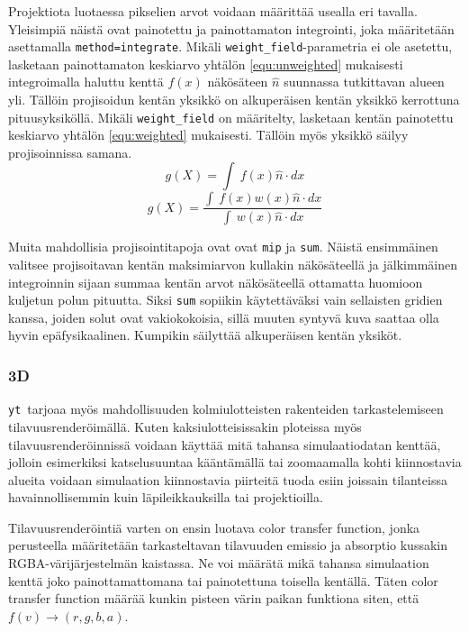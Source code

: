 \documentclass[12pt,a4paper]{article}
\newcommand{\yt}{\texttt{yt}}
\begin{document}
\begin{sloppypar}Projektiota luotaessa pikselien arvot voidaan määrittää usealla eri tavalla. Yleisimpiä näistä ovat painotettu ja painottamaton integrointi, joka määritetään asettamalla \texttt{method=integrate}. Mikäli \texttt{weight\_field}-parametria ei ole asetettu, lasketaan painottamaton keskiarvo yhtälön \ref{equ:unweighted} mukaisesti integroimalla haluttu kenttä $f(x)$ näkösäteen $\hat{n}$ suunnassa tutkittavan alueen yli. Tällöin projisoidun kentän yksikkö on alkuperäisen kentän yksikkö kerrottuna pituusyksiköllä. Mikäli \texttt{weight\_field} on määritelty, lasketaan kentän painotettu keskiarvo yhtälön \ref{equ:weighted} mukaisesti. Tällöin myös yksikkö säilyy projisoinnissa samana. \cite{sliceproj}
\begin{equation}\label{equ:unweighted}
	g(X) = {\int\ {f(x)\hat{n}\cdot{dx}}}
\end{equation}
\begin{equation}\label{equ:weighted}
	g(X) = \frac{\int\ {f(x)w(x)\hat{n}\cdot{dx}}}{\int\ {w(x)\hat{n}\cdot{dx}}}
\end{equation}
\end{sloppypar} 

Muita mahdollisia projisointitapoja ovat ovat \texttt{mip} ja \texttt{sum}. Näistä ensimmäinen valitsee projisoitavan kentän maksimiarvon kullakin näkösäteellä ja jälkimmäinen integroinnin sijaan summaa kentän arvot näkösäteellä ottamatta huomioon kuljetun polun pituutta. Siksi \texttt{sum} sopiikin käytettäväksi vain sellaisten gridien kanssa, joiden solut ovat vakiokokoisia, sillä muuten syntyvä kuva saattaa olla hyvin epäfysikaalinen. Kumpikin säilyttää alkuperäisen kentän yksiköt. \cite{sliceproj, projection}

\subsubsection{3D}
\yt\ tarjoaa myös mahdollisuuden kolmiulotteisten rakenteiden tarkastelemiseen tilavuusrenderöimällä. Kuten kaksiulotteisissakin ploteissa myös tilavuusrenderöinnissä voidaan käyttää mitä tahansa simulaatiodatan kenttää, jolloin esimerkiksi katselusuuntaa kääntä\-mällä tai zoomaamalla kohti kiinnostavia alueita voidaan simulaation kiinnostavia piirteitä tuoda esiin joissain tilanteissa havainnollisemmin kuin läpileikkauksilla tai projektioilla. \cite{volume}

Tilavuusrenderöintiä varten on ensin luotava color transfer function, %
jonka perusteella määritetään tarkasteltavan tilavuuden emissio ja absorptio kussakin RGBA-väri\-järjes\-telmän kaistassa. Ne voi määrätä mikä tahansa simulaation kenttä joko painottamattomana tai painotettuna toisella kentällä. Täten color transfer function määrää kunkin pisteen värin paikan funktiona siten, että $f(v) \rightarrow (r, g, b, a)$. \cite{volume}
\end{document}
